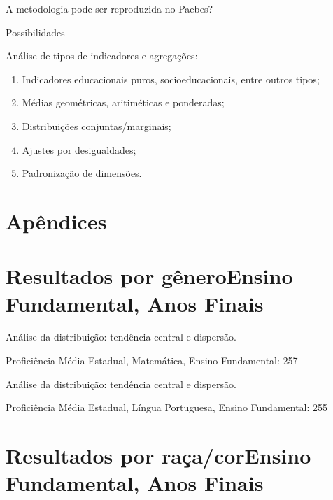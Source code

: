 \documentclass[
  ignorenonframetext,
]{beamer}
\providecommand{\tightlist}{%
  \setlength{\itemsep}{0pt}\setlength{\parskip}{0pt}}
\begin{document}
\begin{frame}
A metodologia pode ser reproduzida no Paebes?

\end{frame}

\begin{frame}
Possibilidades

Análise de tipos de indicadores e agregações:

\begin{enumerate}[<+->]
\tightlist
\item
  Indicadores educacionais puros, socioeducacionais, entre outros tipos;
\item
  Médias geométricas, aritiméticas e ponderadas;
\item
  Distribuições conjuntas/marginais;
\item
  Ajustes por desigualdades;
\item
  Padronização de dimensões.
\end{enumerate}
\end{frame}

\hypertarget{apuxeandices}{%
\section{Apêndices}\label{apuxeandices}}

\hypertarget{resultados-por-guxeanero-ensino-fundamental-anos-finais}{%
\section{\texorpdfstring{Resultados por gêneroEnsino Fundamental, Anos
Finais}{Resultados por gênero  Ensino Fundamental, Anos Finais}}\label{resultados-por-guxeanero-ensino-fundamental-anos-finais}}

\begin{frame}
Análise da distribuição: tendência central e dispersão.

Proficiência Média Estadual, Matemática, Ensino Fundamental: 257
\end{frame}

\begin{frame}
Análise da distribuição: tendência central e dispersão.

Proficiência Média Estadual, Língua Portuguesa, Ensino Fundamental: 255
\end{frame}

\hypertarget{resultados-por-rauxe7acor-ensino-fundamental-anos-finais}{%
\section{\texorpdfstring{Resultados por raça/corEnsino Fundamental, Anos
Finais}{Resultados por raça/cor  Ensino Fundamental, Anos Finais}}\label{resultados-por-rauxe7acor-ensino-fundamental-anos-finais}}
\end{document}
